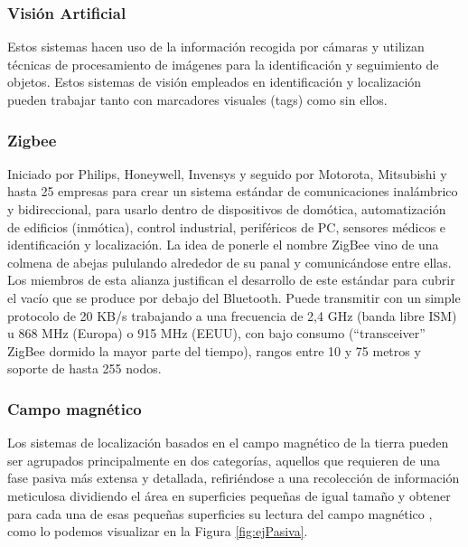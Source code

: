 \subsubsection{Visión Artificial}

Estos sistemas hacen uso de la información recogida por cámaras y utilizan técnicas de procesamiento de imágenes para la identificación y seguimiento de objetos. Estos sistemas de visión empleados en identificación y localización pueden trabajar tanto con marcadores visuales (tags) como sin ellos. 

\subsubsection{Zigbee}

Iniciado por Philips, Honeywell, Invensys y seguido por Motorota, Mitsubishi y hasta 25 empresas para crear un sistema estándar de comunicaciones inalámbrico y bidireccional, para usarlo dentro de dispositivos de domótica, automatización de edificios (inmótica), control industrial, periféricos de PC, sensores médicos e identificación y localización. La idea de ponerle el nombre ZigBee vino de una colmena de abejas pululando alrededor de su panal y comunicándose entre ellas.
Los miembros de esta alianza justifican el desarrollo de este estándar para cubrir el vacío que se produce por debajo del Bluetooth. Puede transmitir con un simple protocolo de 20 KB/s trabajando a una frecuencia de 2,4 GHz (banda libre ISM) u 868 MHz (Europa) o 915 MHz (EEUU), con bajo consumo (“transceiver” ZigBee dormido la mayor parte del tiempo), rangos entre 10 y 75 metros y soporte de hasta 255 nodos. 

\subsubsection{Campo magnético}

Los sistemas de localización basados en el campo magnético de la tierra pueden ser agrupados principalmente en dos categorías, aquellos que requieren de una fase pasiva más extensa y detallada, refiriéndose a una recolección de información meticulosa dividiendo el área en superficies pequeñas de igual tamaño y obtener para cada una de esas pequeñas superficies su lectura del campo magnético \cite{usoCampoMagnetico}, como lo podemos visualizar en la Figura \ref{fig:ejPasiva}.

